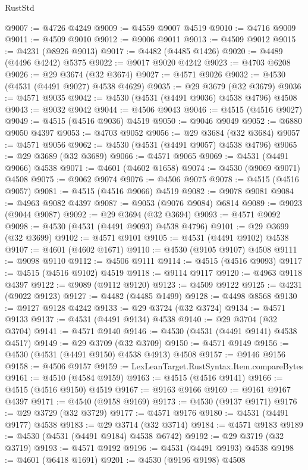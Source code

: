 \begin{lexlean}{RustStd}
\begin{coremodule}
{\begin{coremodule}
{{{{{{{{{{{{{{{{{{{{{{{{{{{{{{{{{{{{{{{{{{{{{{{{{{{{{{{@9007 := @4726 @4249
@9009 := @4559 @9007 @4519
@9010 := @4716 @9009
@9011 := @4509 @9010
@9012 := @9006 @9011
@9013 := @4509 @9012
@9015 := @4231 (@8926 @9013)
@9017 := @4482 (@4485 @1426)
@9020 := @4489 (@4496 @4242) @5375
@9022 := @9017 @9020 @4242
@9023 := @4703 @6208
@9026 := @29 @3674 (@32 @3674)
@9027 := @4571 @9026
@9032 := @4530 (@4531 (@4491 @9027) @4538 @4629)
@9035 := @29 @3679 (@32 @3679)
@9036 := @4571 @9035
@9042 := @4530 (@4531 (@4491 @9036) @4538 @4796) @4508
@9043 := @9032 @9042
@9044 := @4506 @9043
@9046 := @4515 (@4516 @9027)
@9049 := @4515 (@4516 @9036) @4519
@9050 := @9046 @9049
@9052 := @6880 @9050 @4397
@9053 := @4703 @9052
@9056 := @29 @3684 (@32 @3684)
@9057 := @4571 @9056
@9062 := @4530 (@4531 (@4491 @9057) @4538 @4796)
@9065 := @29 @3689 (@32 @3689)
@9066 := @4571 @9065
@9069 := @4531 (@4491 @9066) @4538
@9071 := @4601 (@4602 @1658)
@9074 := @4530 (@9069 @9071) @4508
@9075 := @9062 @9074
@9076 := @4506 @9075
@9078 := @4515 (@4516 @9057)
@9081 := @4515 (@4516 @9066) @4519
@9082 := @9078 @9081
@9084 := @4963 @9082 @4397
@9087 := @9053 (@9076 @9084) @6814
@9089 := @9023 (@9044 @9087)
@9092 := @29 @3694 (@32 @3694)
@9093 := @4571 @9092
@9098 := @4530 (@4531 (@4491 @9093) @4538 @4796)
@9101 := @29 @3699 (@32 @3699)
@9102 := @4571 @9101
@9105 := @4531 (@4491 @9102) @4538
@9107 := @4601 (@4602 @1671)
@9110 := @4530 (@9105 @9107) @4508
@9111 := @9098 @9110
@9112 := @4506 @9111
@9114 := @4515 (@4516 @9093)
@9117 := @4515 (@4516 @9102) @4519
@9118 := @9114 @9117
@9120 := @4963 @9118 @4397
@9122 := @9089 (@9112 @9120)
@9123 := @4509 @9122
@9125 := @4231 (@9022 @9123)
@9127 := @4482 (@4485 @1499)
@9128 := @4498 @8568
@9130 := @9127 @9128 @4242
@9133 := @29 @3724 (@32 @3724)
@9134 := @4571 @9133
@9137 := @4531 (@4491 @9134) @4538
@9140 := @29 @3704 (@32 @3704)
@9141 := @4571 @9140
@9146 := @4530 (@4531 (@4491 @9141) @4538 @4517)
@9149 := @29 @3709 (@32 @3709)
@9150 := @4571 @9149
@9156 := @4530 (@4531 (@4491 @9150) @4538 @4913) @4508
@9157 := @9146 @9156
@9158 := @4506 @9157
@9159 := LexLeanTarget.RustSyntax.Item.compareBytes
@9161 := @4510 (@4584 @9159)
@9163 := @4515 (@4516 @9141)
@9166 := @4515 (@4516 @9150) @4519
@9167 := @9163 @9166
@9169 := @9161 @9167 @4397
@9171 := @4540 (@9158 @9169)
@9173 := @4530 (@9137 @9171)
@9176 := @29 @3729 (@32 @3729)
@9177 := @4571 @9176
@9180 := @4531 (@4491 @9177) @4538
@9183 := @29 @3714 (@32 @3714)
@9184 := @4571 @9183
@9189 := @4530 (@4531 (@4491 @9184) @4538 @6742)
@9192 := @29 @3719 (@32 @3719)
@9193 := @4571 @9192
@9196 := @4531 (@4491 @9193) @4538
@9198 := @4601 (@6418 @1691)
@9201 := @4530 (@9196 @9198) @4508
}}}}}}}}}}}}}}}}}}}}}}}}}}}}}}}}}}}}}}}}}}}}}}}}}}}}}}}
\end{coremodule}}
\end{coremodule}
\end{lexlean}
